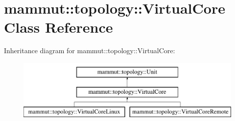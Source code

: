 \hypertarget{classmammut_1_1topology_1_1VirtualCore}{\section{mammut\-:\-:topology\-:\-:Virtual\-Core Class Reference}
\label{classmammut_1_1topology_1_1VirtualCore}
}
Inheritance diagram for mammut\-:\-:topology\-:\-:Virtual\-Core\-:\begin{figure}[H]
\begin{center}
\leavevmode
\includegraphics[height=3.000000cm]{classmammut_1_1topology_1_1VirtualCore}
\end{center}
\end{figure}
